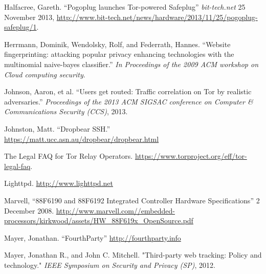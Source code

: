 \documentclass[conference]{IEEEtran}
\begin{document}
\begin{thebibliography}{1}
 Halfacree, Gareth. ``Pogoplug launches Tor-powered Safeplug'' \emph{bit-tech.net} 25 November 2013, \url{http://www.bit-tech.net/news/hardware/2013/11/25/pogoplug-safeplug/1}.

 Herrmann, Dominik, Wendolsky, Rolf, and Federrath, Hannes.  ``Website fingerprinting: attacking popular privacy enhancing technologies with the multinomial naive-bayes classifier.'' \emph{In Proceedings of the 2009 ACM workshop on Cloud computing security}.

 Johnson, Aaron, et al. ``Users get routed: Traffic correlation on Tor by realistic adversaries.'' \emph{Proceedings of the 2013 ACM SIGSAC conference on Computer \& Communications Security (CCS)}, 2013.

 Johnston, Matt. ``Dropbear SSH.'' \url{https://matt.ucc.asn.au/dropbear/dropbear.html}


 The Legal FAQ for Tor Relay Operators. \url{https://www.torproject.org/eff/tor-legal-faq}.

 Lighttpd. \url{http://www.lighttpd.net}


 Marvell, ``88F6190 and 88F6192 Integrated Controller Hardware Specifications'' 2 December 2008. \url{http://www.marvell.com//embedded-processors/kirkwood/assets/HW_88F619x_OpenSource.pdf}



 Mayer, Jonathan. ``FourthParty'' \url{http://fourthparty.info}

 Mayer, Jonathan R., and John C. Mitchell. "Third-party web tracking: Policy and technology." \emph{IEEE Symposium on Security and Privacy (SP)}, 2012.



\end{thebibliography}
\end{document}
